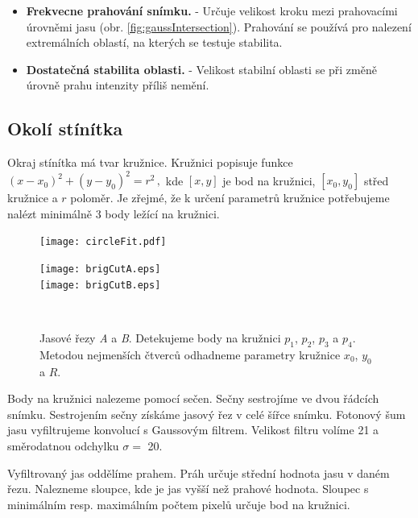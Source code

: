    \begin{itemize}
   \item \textbf{Frekvecne prahování snímku.} - Určuje velikost kroku mezi prahovacími úrovněmi jasu (obr. \ref{fig:gaussIntersection}). Prahování se používá pro nalezení extremálních oblastí, na kterých se testuje stabilita.
   
   \item \textbf{Dostatečná stabilita oblasti.} - Velikost stabilní oblasti se při změně úrovně prahu intenzity příliš nemění. 
   \end{itemize}
   
\subsection{Okolí stínítka}
\label{sec:okoliStinitka}
	Okraj stínítka má tvar kružnice. Kružnici popisuje funkce $\left(x-x_0\right)^2 + \left(y-y_0\right)^2 = r^2\,,$ kde $\left[x,y\right]$ je bod na kružnici, $\left[x_0,y_0\right]$ střed kružnice a $r$ poloměr. Je zřejmé, že k určení parametrů kružnice potřebujeme nalézt minimálně 3 body ležící na kružnici. 

\begin{figure}[h!]
    \centering
    \begin{minipage}[c]{0.48\textwidth}
        \centering\texttt{[image: circleFit.pdf]}
    \end{minipage}
    \begin{minipage}[c]{0.48\textwidth}
        \centering\texttt{[image: brigCutA.eps]}\\
        
        \centering\texttt{[image: brigCutB.eps]}
    \end{minipage}
    \\
        \caption[Detekce okolí stínítka.]{Jasové řezy \textit{A} a \textit{B}. Detekujeme body na kružnici $p_1$, $p_2$, $p_3$ a $p_4$. Metodou nejmenších čtverců odhadneme parametry kružnice $x_0$, $y_0$ a $R$.}
        \label{fig:CircleFit}
\end{figure}

Body na kružnici nalezeme pomocí sečen. Sečny sestrojíme ve dvou řádcích snímku. %
Sestrojením sečny získáme jasový řez v celé šířce snímku. Fotonový šum jasu vyfiltrujeme konvolucí s Gaussovým filtrem. Velikost filtru volíme \SI{21}{\px} a směrodatnou odchylku $\sigma = $ \SI{20}{\px}. 

Vyfiltrovaný jas oddělíme prahem. Práh určuje střední hodnota jasu v daném řezu. Nalezneme sloupce, kde je jas vyšší než prahové hodnota. Sloupec s minimálním resp. maximálním počtem pixelů určuje bod na kružnici.  

